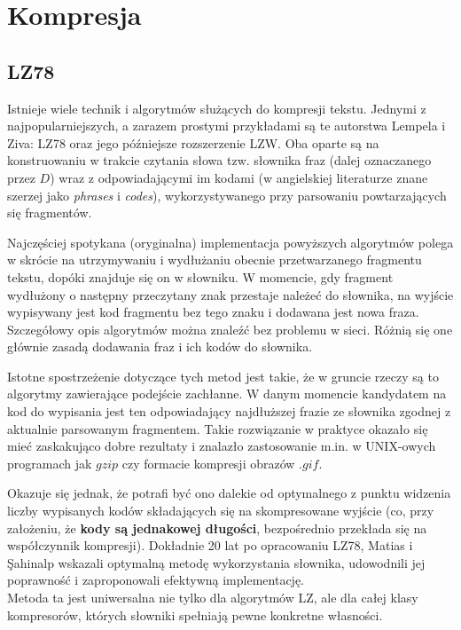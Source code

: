 \section{Kompresja}


\subsection{LZ78}

Istnieje wiele technik i algorytmów służących do kompresji tekstu. Jednymi z najpopularniejszych, a zarazem prostymi przykładami są te autorstwa Lempela i Ziva: LZ78 oraz jego późniejsze rozszerzenie LZW. Oba oparte są na konstruowaniu w trakcie czytania słowa tzw. słownika fraz (dalej oznaczanego przez $D$) wraz z odpowiadającymi im kodami (w angielskiej literaturze znane szerzej jako \textit{phrases} i \textit{codes}), wykorzystywanego przy parsowaniu powtarzających się fragmentów. 

Najczęściej spotykana (oryginalna) implementacja powyższych algorytmów polega w skrócie na utrzymywaniu i wydłużaniu obecnie przetwarzanego fragmentu tekstu, dopóki znajduje się on w słowniku. W momencie, gdy fragment wydłużony o następny przeczytany znak przestaje należeć do słownika, na wyjście wypisywany jest kod fragmentu bez tego znaku i dodawana jest nowa fraza. Szczegółowy opis algorytmów można znaleźć bez problemu w sieci. Różnią się one głównie zasadą dodawania fraz i ich kodów do słownika.

Istotne spostrzeżenie dotyczące tych metod jest takie, że w gruncie rzeczy są to algorytmy zawierające podejście zachłanne. W danym momencie kandydatem na kod do wypisania jest ten odpowiadający najdłuższej frazie ze słownika zgodnej z aktualnie parsowanym fragmentem. Takie rozwiązanie w praktyce okazało się mieć zaskakująco dobre rezultaty i znalazło zastosowanie m.in. w UNIX-owych programach jak $gzip$ czy formacie kompresji obrazów $.gif$.

Okazuje się jednak, że potrafi być ono dalekie od optymalnego z punktu widzenia liczby wypisanych kodów składających się na skompresowane wyjście (co, przy założeniu, że \textbf{kody są jednakowej długości}, bezpośrednio przekłada się na współczynnik kompresji). Dokładnie 20 lat po opracowaniu LZ78, Matias i Şahinalp wskazali optymalną metodę wykorzystania słownika, udowodnili jej poprawność i zaproponowali efektywną implementację.\\
Metoda ta jest uniwersalna nie tylko dla algorytmów LZ, ale dla całej klasy kompresorów, których słowniki spełniają pewne konkretne własności.

